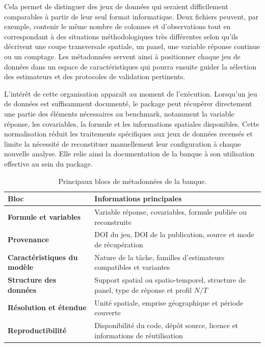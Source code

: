 \documentclass[11pt,a4paper]{article}
\begin{document}
Cela permet de distinguer des jeux de données qui seraient difficilement comparables à partir de leur seul format informatique. Deux fichiers peuvent, par exemple, contenir le même nombre de colonnes et d'observations tout en correspondant à des situations méthodologiques très différentes selon qu'ils décrivent une coupe transversale spatiale, un panel, une variable réponse continue ou un comptage. Les métadonnées servent ainsi à positionner chaque jeu de données dans un espace de caractéristiques qui pourra ensuite guider la sélection des estimateurs et des protocoles de validation pertinents.

L'intérêt de cette organisation apparaît au moment de l'exécution. Lorsqu'un jeu de données est suffisamment documenté, le package peut récupérer directement une partie des éléments nécessaires au benchmark, notamment la variable réponse, les covariables, la formule et les informations spatiales disponibles. Cette normalisation réduit les traitements spécifiques aux jeux de données recensés et limite la nécessité de reconstituer manuellement leur configuration à chaque nouvelle analyse. Elle relie ainsi la documentation de la banque à son utilisation effective au sein du package.
\begin{table}[H]
\centering
\small
\begin{tabularx}{\textwidth}{>{\bfseries}p{4.1cm} X}
\toprule
Bloc & Informations principales \\
\midrule
Formule et variables &
Variable réponse, covariables, formule publiée ou reconstruite \\

Provenance &
DOI du jeu, DOI de la publication, source et mode de récupération \\

Caractéristiques du modèle &
Nature de la tâche, familles d'estimateurs compatibles et variantes \\

Structure des données &
Support spatial ou spatio-temporel, structure de panel, type de réponse et profil $N/T$ \\

Résolution et étendue &
Unité spatiale, emprise géographique et période couverte \\

Reproductibilité &
Disponibilité du code, dépôt source, licence et informations de réutilisation \\
\bottomrule
\end{tabularx}

\caption{Principaux blocs de métadonnées de la banque.}
\label{tab:metadata-blocks}
\end{table}
\end{document}
